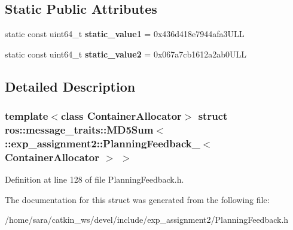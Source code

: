 \subsection*{Static Public Attributes}
\begin{DoxyCompactItemize}
\item 
\mbox{\label{structros_1_1message__traits_1_1MD5Sum_3_01_1_1exp__assignment2_1_1PlanningFeedback___3_01ContainerAllocator_01_4_01_4_ae61e5c0212a04316f75d935f47b0c0a6}} 
static const uint64\+\_\+t {\bfseries static\+\_\+value1} = 0x436d418e7944afa3\+U\+LL
\item 
\mbox{\label{structros_1_1message__traits_1_1MD5Sum_3_01_1_1exp__assignment2_1_1PlanningFeedback___3_01ContainerAllocator_01_4_01_4_af2e51b455f93b12a079b8c20b6d90a15}} 
static const uint64\+\_\+t {\bfseries static\+\_\+value2} = 0x067a7cb1612a2ab0\+U\+LL
\end{DoxyCompactItemize}


\subsection{Detailed Description}
\subsubsection*{template$<$class Container\+Allocator$>$\newline
struct ros\+::message\+\_\+traits\+::\+M\+D5\+Sum$<$ \+::exp\+\_\+assignment2\+::\+Planning\+Feedback\+\_\+$<$ Container\+Allocator $>$ $>$}



Definition at line 128 of file Planning\+Feedback.\+h.



The documentation for this struct was generated from the following file\+:\begin{DoxyCompactItemize}
\item 
/home/sara/catkin\+\_\+ws/devel/include/exp\+\_\+assignment2/Planning\+Feedback.\+h\end{DoxyCompactItemize}
